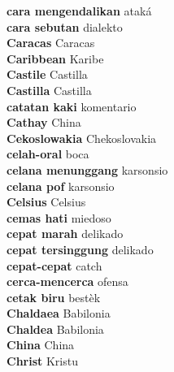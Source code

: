 \textbf{ cara mengendalikan  } ataká \\
\textbf{ cara sebutan  } dialekto \\
\textbf{ Caracas  } Caracas \\
\textbf{ Caribbean  } Karibe \\
\textbf{ Castile  } Castilla \\
\textbf{ Castilla  } Castilla \\
\textbf{ catatan kaki  } komentario \\
\textbf{ Cathay  } China \\
\textbf{ Cekoslowakia  } Chekoslovakia \\
\textbf{ celah-oral  } boca \\
\textbf{ celana menunggang  } karsonsio \\
\textbf{ celana pof  } karsonsio \\
\textbf{ Celsius  } Celsius \\
\textbf{ cemas hati  } miedoso \\
\textbf{ cepat marah  } delikado \\
\textbf{ cepat tersinggung  } delikado \\
\textbf{ cepat-cepat  } catch \\
\textbf{ cerca-mencerca  } ofensa \\
\textbf{ cetak biru  } bestèk \\
\textbf{ Chaldaea  } Babilonia \\
\textbf{ Chaldea  } Babilonia \\
\textbf{ China  } China \\
\textbf{ Christ  } Kristu \\
